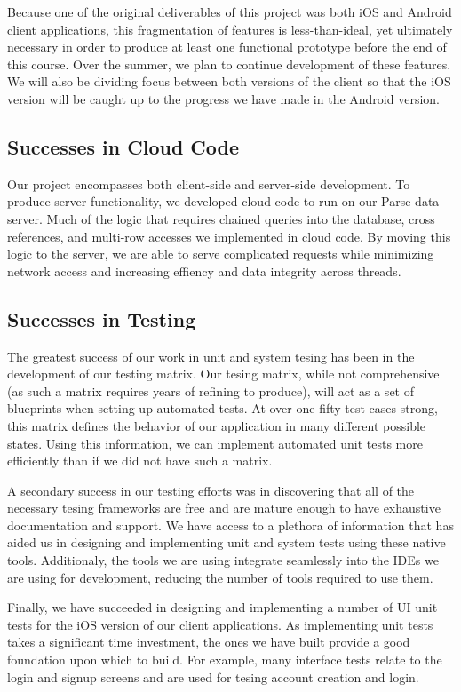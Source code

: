 Because one of the original deliverables of this project was both iOS and
Android client applications, this fragmentation of features is less-than-ideal,
yet ultimately necessary in order to produce at least one functional prototype
before the end of this course. Over the summer, we plan to continue development
of these features. We will also be dividing focus between both versions of the
client so that the iOS version will be caught up to the progress we have made in
the Android version.


\subsection{Successes in Cloud Code}

Our project encompasses both client-side and server-side development. To produce
server functionality, we developed cloud code to run on our Parse data server.
Much of the logic that requires chained queries into the database, cross
references, and multi-row accesses we implemented in cloud code. By moving this
logic to the server, we are able to serve complicated requests while minimizing
network access and increasing effiency and data integrity across threads.


\subsection{Successes in Testing}

The greatest success of our work in unit and system tesing has been in the
development of our testing matrix. Our tesing matrix, while not comprehensive
(as such a matrix requires years of refining to produce), will act as a set of
blueprints when setting up automated tests. At over one fifty test cases
strong, this matrix defines the behavior of our application in many different
possible states. Using this information, we can implement automated unit tests
more efficiently than if we did not have such a matrix.

A secondary success in our testing efforts was in discovering that all of the
necessary tesing frameworks are free and are mature enough to have exhaustive
documentation and support. We have access to a plethora of information that has
aided us in designing and implementing unit and system tests using these native
tools. Additionaly, the tools we are using integrate seamlessly into the IDEs we
are using for development, reducing the number of tools required to use them.

Finally, we have succeeded in designing and implementing a number of UI unit
tests for the iOS version of our client applications. As implementing unit tests
takes a significant time investment, the ones we have built provide a good
foundation upon which to build. For example, many interface tests relate to the
login and signup screens and are used for tesing account creation and login.


